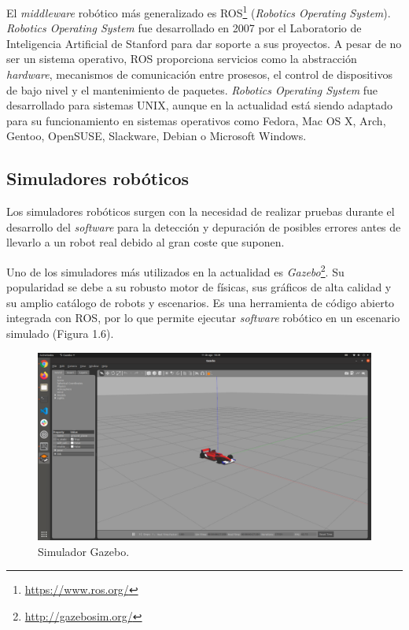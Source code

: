 \documentclass[a4paper, 12pt]{book}
\begin{document}
El \textit{middleware} robótico más generalizado es ROS\footnote{\url{https://www.ros.org/}}
 (\textit{Robotics Operating System}). \textit{Robotics Operating System} fue desarrollado en 2007 por el Laboratorio de Inteligencia Artificial de Stanford para dar soporte a sus proyectos. A pesar de no ser un sistema operativo, ROS proporciona servicios como la abstracción \textit{hardware}, mecanismos de comunicación entre prosesos, el control de dispositivos de bajo nivel y el mantenimiento de paquetes. \textit{Robotics Operating System} fue desarrollado para sistemas UNIX, aunque en la actualidad está siendo adaptado para su funcionamiento en sistemas operativos como Fedora, Mac OS X, Arch, Gentoo, OpenSUSE, Slackware, Debian o Microsoft Windows.

\subsection{Simuladores robóticos}
\label{subsec:simuladores}

Los simuladores robóticos surgen con la necesidad de realizar pruebas durante el desarrollo del \textit{software} para la detección y depuración de posibles errores antes de llevarlo a un robot real debido al gran coste que suponen.

Uno de los simuladores más utilizados en la actualidad es \textit{Gazebo}\footnote{\url{http://gazebosim.org/}}. Su popularidad se debe a su robusto motor de físicas, sus gráficos de alta calidad y su amplio catálogo de robots y escenarios. Es una herramienta de código abierto integrada con ROS, por lo que permite ejecutar \textit{software} robótico en un escenario simulado (Figura 1.6).

\begin{figure}[H]
	\centering
    \includegraphics[width=\textwidth]{img/gazebo}
    \caption{Simulador Gazebo.}
    \label{figura:simulador_gazebo}
\end{figure}
\end{document}

